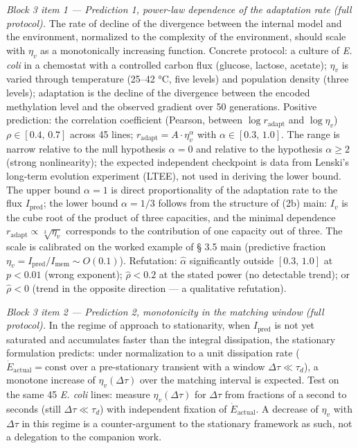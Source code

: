 \documentclass[pdflatex,sn-mathphys-ay]{sn-jnl}
\begin{document}
\emph{Block 3 item 1 --- Prediction 1, power-law dependence of the adaptation rate (full protocol).} The rate of decline of the divergence between the internal model and the environment, normalized to the complexity of the environment, should scale with \(\eta_v\) as a monotonically increasing function. Concrete protocol: a culture of \emph{E. coli} in a chemostat with a controlled carbon flux (glucose, lactose, acetate); \(\eta_v\) is varied through temperature (25--42 °C, five levels) and population density (three levels); adaptation is the decline of the divergence between the encoded methylation level and the observed gradient over 50 generations. Positive prediction: the correlation coefficient (Pearson, between \(\log r_{\text{adapt}}\) and \(\log \eta_v\)) \(\rho \in [0.4,\, 0.7]\) across 45 lines; \(r_{\text{adapt}} = A \cdot \eta_v^{\alpha}\) with \(\alpha \in [0.3,\, 1.0]\). The range is narrow relative to the null hypothesis \(\alpha = 0\) and relative to the hypothesis \(\alpha \ge 2\) (strong nonlinearity); the expected independent checkpoint is data from Lenski's long-term evolution experiment (LTEE), not used in deriving the lower bound. The upper bound \(\alpha = 1\) is direct proportionality of the adaptation rate to the flux \(I_{\text{pred}}\); the lower bound \(\alpha = 1/3\) follows from the structure of (2b) main: \(I_v\) is the cube root of the product of three capacities, and the minimal dependence \(r_{\text{adapt}} \propto \sqrt[3]{\eta_v}\) corresponds to the contribution of one capacity out of three. The scale is calibrated on the worked example of § 3.5 main (predictive fraction \(\eta_v = I_{\text{pred}}/I_{\text{mem}} \sim O(0.1)\)). Refutation: \(\hat{\alpha}\) significantly outside \([0.3,\, 1.0]\) at \(p < 0.01\) (wrong exponent); \(\hat{\rho} < 0.2\) at the stated power (no detectable trend); or \(\hat{\rho} < 0\) (trend in the opposite direction --- a qualitative refutation).

\emph{Block 3 item 2 --- Prediction 2, monotonicity in the matching window (full protocol).} In the regime of approach to stationarity, when \(I_{\text{pred}}\) is not yet saturated and accumulates faster than the integral dissipation, the stationary formulation predicts: under normalization to a unit dissipation rate (\(\dot{E}_{\text{actual}} = \text{const}\) over a pre-stationary transient with a window \(\Delta\tau \ll \tau_d\)), a monotone increase of \(\eta_v(\Delta\tau)\) over the matching interval is expected. Test on the same 45 \emph{E. coli} lines: measure \(\eta_v(\Delta\tau)\) for \(\Delta\tau\) from fractions of a second to seconds (still \(\Delta\tau \ll \tau_d\)) with independent fixation of \(\dot{E}_{\text{actual}}\). A decrease of \(\eta_v\) with \(\Delta\tau\) in this regime is a counter-argument to the stationary framework as such, not a delegation to the companion work.
\end{document}
